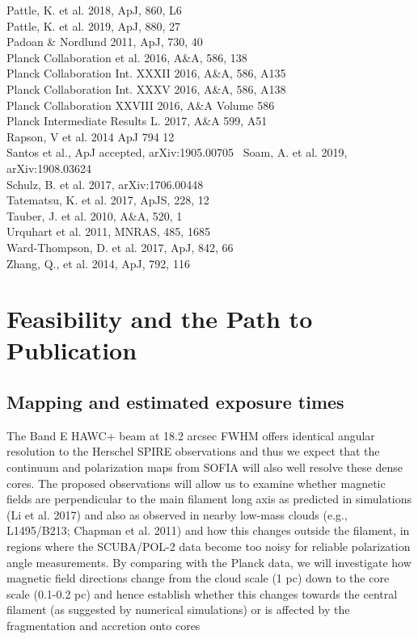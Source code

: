\documentclass[11pt]{amsart}
\begin{document}
{Pattle, K.  et al. 2018, ApJ, 860, L6 \\
Pattle, K. et al. 2019, ApJ, 880, 27 \\
Padoan \& Nordlund 2011, ApJ, 730, 40 \\
Planck Collaboration et al. 2016, A\&A, 586, 138 \\ 
Planck Collaboration Int. XXXII 2016, A\&A, 586, A135 \\
Planck Collaboration Int. XXXV 2016, A\&A, 586, A138 \\
Planck Collaboration XXVIII 2016, A\&A Volume 586 \\
Planck Intermediate Results L.  2017, A\&A 599, A51 \\
Rapson, V et al. 2014 ApJ 794 12 \\
Santos et al., ApJ accepted, arXiv:1905.00705 \
Soam, A. et al. 2019, arXiv:1908.03624\\
Schulz, B. et al. 2017, arXiv:1706.00448 \\
Tatematsu, K. et al. 2017, ApJS, 228, 12\\
Tauber, J.  et al. 2010, A\&A, 520, 1 \\
Urquhart et al. 2011, MNRAS, 485, 1685\\
Ward-Thompson, D. et al. 2017,  ApJ, 842, 66 \\
Zhang, Q., et al. 2014, ApJ, 792, 116

\newpage
\section{Feasibility and the Path to Publication}

\subsection{Mapping and estimated exposure times\label{sec:exptime}}

The Band E HAWC+ beam at 18.2 arcsec FWHM offers identical angular resolution to the Herschel SPIRE observations
and thus we expect that the continuum and polarization maps from SOFIA will also well resolve these dense cores.
The proposed observations will allow us to examine whether magnetic fields are perpendicular to the main filament long axis as predicted in simulations (Li et al. 2017) and also as observed in nearby low-mass clouds (e.g., L1495/B213; Chapman et al. 2011) and how this changes outside the filament, in regions where the SCUBA/POL-2 data become too noisy for reliable polarization angle measurements.
By comparing with the Planck data, we will investigate how magnetic field directions change from the 
cloud scale (1 pc) down to the core scale (0.1-0.2 pc) and hence establish whether 
this changes towards the central filament (as suggested by numerical simulations) or is affected by the fragmentation and accretion onto cores}
\end{document}

